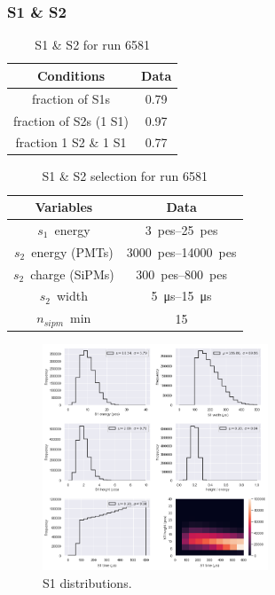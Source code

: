 \begin{frame}
\frametitle{S1 \& S2}

\begin{table}[h!]
\caption{S1 \& S2 for run 6581}
\begin{center}
\begin{tabular}{|c|c|}
\hline
Conditions & Data \\
\hline
fraction of S1s & 0.79 \\
fraction of S2s (1 S1) & 0.97 \\
fraction 1 S2 \& 1 S1 & 0.77 \\
\hline
\end{tabular}
\end{center}
\label{r6581.data}
\end{table}%

\begin{table}[h!]
\caption{S1 \& S2 selection for run 6581}
\begin{center}
\begin{tabular}{|c|c|}
\hline
Variables & Data \\
\hline
$s_1$~energy & \SIrange{3}{25}{pes} \\
$s_2$~energy (PMTs) & \SIrange{3000}{14000}{pes}\\
$s_2$~charge (SiPMs) & \SIrange{300}{800}{pes}\\
$s_2$~width & \SIrange{5}{15}{\micro\second}\\
$n_{sipm}$~min & 15\\
\hline
\end{tabular}
\end{center}
\label{r6581.sel}
\end{table}%
\end{frame}


\begin{frame}
\begin{figure}
  \begin{center}
      \includegraphics[width=0.6\textwidth]{img/r6581/s1.png}
    \caption{S1 distributions.}
  \end{center}
\end{figure}
\end{frame}

